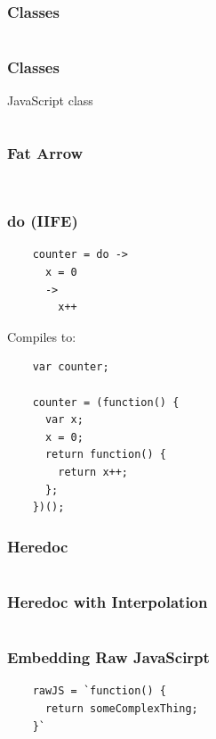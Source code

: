 \documentclass{beamer}
\begin{document}
\begin{frame}
  \frametitle{Classes}
    \inputminted[lineos=false,fontsize=\normalsize]{coffeescript}{src/sku-class.coffee}
\end{frame}

\begin{frame}
  \frametitle{Classes}
  JavaScript class
  \vspace{.5cm}
  \inputminted[lineos=true,fontsize=\tiny]{javascript}{src/sku-class.js}
\end{frame}

\begin{frame}
  \frametitle{Fat Arrow}
  \inputminted[lineos=false,fontsize=\small]{coffeescript}{src/fat.coffee}
  \pause
  \vspace{.5cm}
  \inputminted[lineos=false,fontsize=\tiny]{javascript}{src/fat.js}
\end{frame}

\begin{frame}[fragile]
  \frametitle{do (IIFE)}
  \begin{verbatim}
    counter = do ->
      x = 0
      ->
        x++
  \end{verbatim}
  \pause
  \vspace{.5cm}
  Compiles to:
  \vspace{.5cm}
  \begin{verbatim}
    var counter;

    counter = (function() {
      var x;
      x = 0;
      return function() {
        return x++;
      };
    })();
  \end{verbatim}
\end{frame}

\begin{frame}
  \frametitle{Heredoc}
  \inputminted{coffeescript}{src/heredoc.coffee}
\end{frame}

\begin{frame}
  \frametitle{Heredoc with Interpolation}
  \inputminted{coffeescript}{src/heredoc_interp.coffee}
\end{frame}

\begin{frame}[fragile]
  \frametitle{Embedding Raw JavaScirpt}
  \begin{verbatim}
    rawJS = `function() {
      return someComplexThing;
    }`
  \end{verbatim}
\end{frame}
\end{document}
